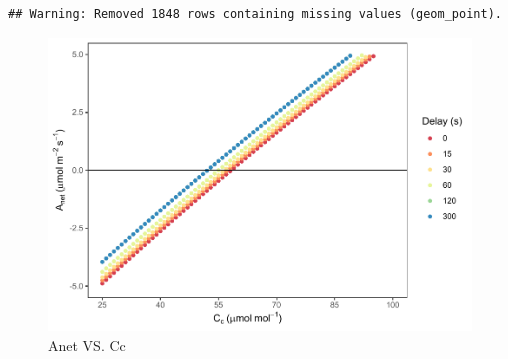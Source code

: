 \documentclass[
]{krantz}
\begin{document}
\begin{verbatim}
## Warning: Removed 1848 rows containing missing values (geom_point).
\end{verbatim}

\begin{figure}
\centering
\includegraphics{bookdown_files/figure-latex/anetcc-1.pdf}
\caption{\label{fig:anetcc}Anet VS. Cc}
\end{figure}
\end{document}
